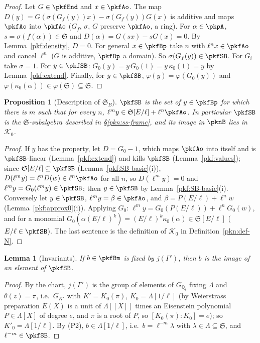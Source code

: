 \documentclass[10pt]{amsart}
\newtheorem{proposition}[theorem]{Proposition}
\newtheorem{lemma}[theorem]{Lemma}
\theoremstyle{definition}
\theoremstyle{remark}
\newcommand{\Q}{\mathbb Q}
\begin{document}
\begin{proof}
Let $G\in\pkfEnd$ and $x\in\pkfAo$. The map $D(y)=G(\sigma(G_f(y))x)-\sigma(G_f(y))G(x)$ is additive and
maps $\pkfAo$ into $\pkfAo$ ($G_f$, $\sigma$, $G$ preserve $\pkfAo$, a ring). For $\alpha\in\pkpA$,
$s=\sigma(f(\alpha))\in\mathfrak S$ and $D(\alpha)=G(sx)-sG(x)=0$. By Lemma~\ref{pkf:density}, $D=0$. For
general $x\in\pkfBp$ take $n$ with $\ell^nx\in\pkfAo$ and cancel $\ell^n$ ($G$ is additive, $\pkfBp$ a
domain). So $\sigma(G_f(y))\in\pkfSB$. For $G_i$ take $\sigma=1$. For $y\in\pkfSB$: $G_0(y)=y\,G_0(1)=
y\,\kappa_0(1)=y$ by Lemma~\ref{pkf:extend}. Finally, for $y\in\pkfSB$, $\varphi(y)=\varphi(G_0(y))$ and
$\varphi(\kappa_0(\alpha))\in\varphi(\mathfrak S)\subseteq\mathfrak S$.
\end{proof}

\begin{proposition}[Description of $\mathfrak S_B$]\label{pkf:closure}
$\pkfSB$ is the set of $y\in\pkfBp$ for which there is $m$ such that for every $n$,
$\ell^my\in\mathfrak S[E/\ell]+\ell^n\pkfAo$. In particular $\pkfSB$ is the $\mathfrak S$-subalgebra
described in \S\ref{pkn:ss-frame}, and its image in $\pknB$ lies in $\mathcal K_0$.
\end{proposition}

\begin{proof}
If $y$ has the property, let $D=G_0-1$, which maps $\pkfAo$ into itself and is $\pkfSB$-linear
(Lemma~\ref{pkf:extend}) and kills $\pkfSB$ (Lemma~\ref{pkf:values}); since $\mathfrak S[E/\ell]
\subseteq\pkfSB$ (Lemma~\ref{pkf:SB-basic}(i)), $D(\ell^my)=\ell^nD(w)\in\ell^n\pkfAo$ for all $n$, so
$D(\ell^my)=0$ and $\ell^my=G_0(\ell^my)\in\pkfSB$; then $y\in\pkfSB$ by Lemma~\ref{pkf:SB-basic}(i).
Conversely let $y\in\pkfSB$, $\ell^my=\beta\in\pkfAo$, and $\beta=P(E/\ell)+\ell^nw$
(Lemma~\ref{pkf:approx0}(i)). Applying $G_0$: $\ell^my=G_0(P(E/\ell))+\ell^nG_0(w)$, and for a monomial
$G_0(\alpha(E/\ell)^k)=(E/\ell)^k\kappa_0(\alpha)\in\mathfrak S[E/\ell]$ ($E/\ell\in\pkfSB$). The last
sentence is the definition of $\mathcal K_0$ in Definition~\ref{pkn:def-N}.
\end{proof}

\begin{lemma}[Invariants]\label{pkf:invariants}
If $b\in\pkfBm$ is fixed by $j(\Gamma')$, then $b$ is the image of an element of $\pkfSB$.
\end{lemma}

\begin{proof}
By the chart, $j(\Gamma')$ is the group of elements of $G_{\Q_\ell}$ fixing $\Lambda$ and $\theta(z)=\pi$,
i.e.\ $G_{K'}$ with $K'=K_0(\pi)$, $K_0=\Lambda[1/\ell]$ (by Weierstrass preparation $E(X)$ is a
unit of $\Lambda[[X]]$ times an Eisenstein polynomial $P\in\Lambda[X]$ of degree $e$, and $\pi$ is a
root of $P$, so $[K_0(\pi):K_0]=e$); so $K'_0=\Lambda[1/\ell]$. By (P2), $b\in\Lambda[1/\ell]$, i.e.\
$b=\ell^{-m}\lambda$ with $\lambda\in\Lambda\subseteq\mathfrak S$, and $\ell^{-m}\in\pkfSB$.
\end{proof}
\end{document}

